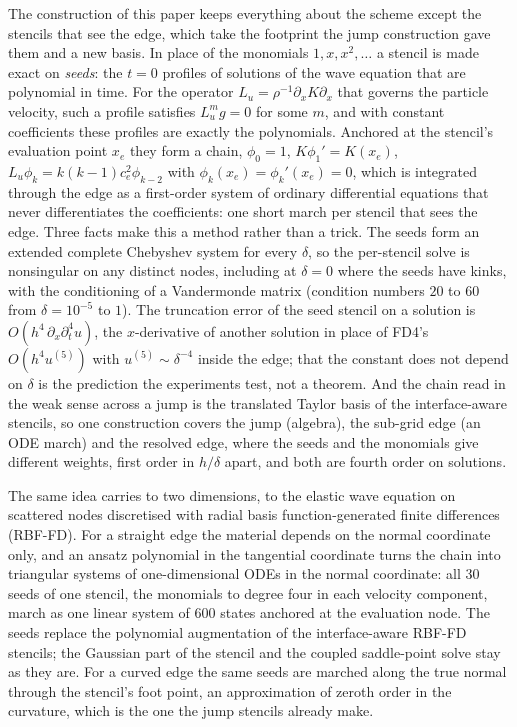 \documentclass[11pt]{amsart}
\theoremstyle{definition}
\theoremstyle{remark}
\newcommand{\Lu}{L_u}
\newcommand{\px}{\partial_x}
\newcommand{\pt}{\partial_t}
\begin{document}
The construction of this paper keeps everything about the scheme except
the stencils that see the edge, which take the footprint the jump
construction gave them and a new basis. In place of the
monomials $1, x, x^2, \ldots$ a stencil is made exact on \emph{seeds}:
the $t = 0$ profiles of solutions of the wave equation that are
polynomial in time. For the operator $\Lu = \rho^{-1} \px K \px$ that
governs the particle velocity, such a profile satisfies $\Lu^m g = 0$
for some $m$, and with constant coefficients these profiles are exactly
the polynomials. Anchored at the stencil's evaluation point $x_e$ they
form a chain, $\phi_0 = 1$, $K \phi_1' = K(x_e)$,
$\Lu \phi_k = k (k - 1) c_e^2 \phi_{k-2}$ with $\phi_k(x_e) = \phi_k'(x_e)
= 0$, which is integrated through the edge as a first-order system of
ordinary differential equations that never differentiates the
coefficients: one short march per stencil that sees the edge. Three
facts make this a method rather than a trick. The seeds form an extended
complete Chebyshev system for every $\delta$, so the per-stencil solve is
nonsingular on any distinct nodes, including at $\delta = 0$ where the
seeds have kinks, with the conditioning of a Vandermonde matrix
(condition numbers $20$ to $60$ from $\delta = 10^{-5}$ to $1$). The
truncation error of the seed stencil on a solution is
$O(h^4\, \px \pt^4 u)$, the $x$-derivative of another solution in place
of FD4's $O(h^4 u^{(5)})$ with $u^{(5)} \sim \delta^{-4}$ inside the edge;
that the constant does not depend on $\delta$ is the prediction the
experiments test, not a theorem. And
the chain read in the weak sense across a jump is the translated Taylor
basis of the interface-aware stencils, so one construction covers the
jump (algebra), the sub-grid edge (an ODE march) and the resolved edge,
where the seeds and the monomials give different weights, first order in
$h / \delta$ apart, and both are fourth order on solutions.

The same idea carries to two dimensions, to the elastic wave equation
on scattered nodes discretised with radial basis function-generated
finite differences (RBF-FD). For a straight edge the material depends on
the normal coordinate only, and an ansatz polynomial in the tangential
coordinate turns the chain into triangular systems of one-dimensional
ODEs in the normal coordinate: all $30$ seeds of one stencil, the
monomials to degree four in each velocity component, march as one linear
system of $600$ states anchored at the evaluation node. The seeds
replace the polynomial augmentation of the interface-aware RBF-FD
stencils; the Gaussian part of the stencil and the coupled saddle-point
solve stay as they are. For a curved edge the same seeds are marched
along the true normal through the stencil's foot point, an approximation
of zeroth order in the curvature, which is the one the jump stencils
already make.
\end{document}

